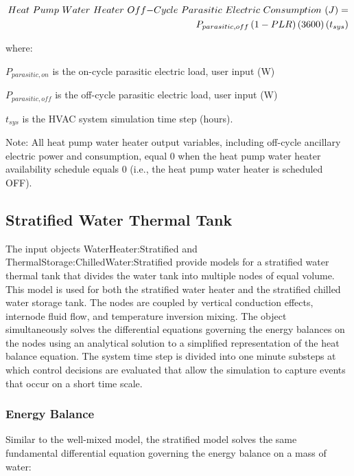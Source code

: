 \begin{equation}
\begin{split}
Heat~Pump~Water~Heater~Off{\rm{ - }}Cycle~Parasitic~Electric~Consumption~(J) = \\{P_{parasitic,off}}\left( {1 - PLR} \right)\left( {3600} \right)\left( {{t_{sys}}} \right)
\end{split}
\end{equation}

where:

\({P_{parasitic,on}}\) is the on-cycle parasitic electric load, user input (W)

\({P_{parasitic,off}}\) is the off-cycle parasitic electric load, user input (W)

\({t_{sys}}\) is the HVAC system simulation time step (hours).

Note: All heat pump water heater output variables, including off-cycle ancillary electric power and consumption, equal 0 when the heat pump water heater availability schedule equals 0 (i.e., the heat pump water heater is scheduled OFF).

\subsection{Stratified Water Thermal Tank}\label{stratified-water-thermal-tank}

The input objects WaterHeater:Stratified and ThermalStorage:ChilledWater:Stratified provide models for a stratified water thermal tank that divides the water tank into multiple nodes of equal volume. This model is used for both the stratified water heater and the stratified chilled water storage tank. The nodes are coupled by vertical conduction effects, internode fluid flow, and temperature inversion mixing. The object simultaneously solves the differential equations governing the energy balances on the nodes using an analytical solution to a simplified representation of the heat balance equation. The system time step is divided into one minute substeps at which control decisions are evaluated that allow the simulation to capture events that occur on a short time scale.

\subsubsection{Energy Balance}\label{energy-balance-1}

Similar to the well-mixed model, the stratified model solves the same fundamental differential equation governing the energy balance on a mass of water:

